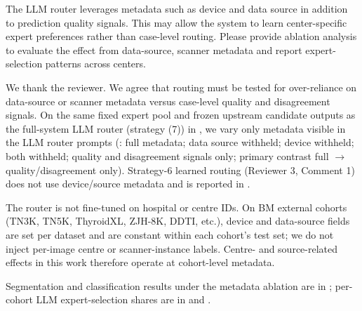 \begin{reviewercomment}
The LLM router leverages metadata such as device and data source in addition to prediction quality signals. This may allow the system to learn center-specific expert preferences rather than case-level routing. Please provide ablation analysis to evaluate the effect from data-source, scanner metadata and report expert-selection patterns across centers.
\end{reviewercomment}
\begin{authorresponse}
We thank the reviewer. We agree that routing must be tested for over-reliance on data-source or scanner metadata versus case-level quality and disagreement signals. On the same fixed expert pool and frozen upstream candidate outputs as the full-system LLM router (strategy (7)) in , we vary only metadata visible in the LLM router prompts (: full metadata; data source withheld; device withheld; both withheld; quality and disagreement signals only; primary contrast full $\rightarrow$ quality/disagreement only). Strategy-6 learned routing (Reviewer 3, Comment 1) does not use device/source metadata and is reported in .\par
The router is not fine-tuned on hospital or centre IDs. On BM external cohorts (TN3K, TN5K, ThyroidXL, ZJH-8K, DDTI, etc.), device and data-source fields are set per dataset and are constant within each cohort's test set; we do not inject per-image centre or scanner-instance labels. Centre- and source-related effects in this work therefore operate at cohort-level metadata.\par
Segmentation and classification results under the metadata ablation are in ; per-cohort LLM expert-selection shares are in  and .\par
\par
\end{authorresponse}

